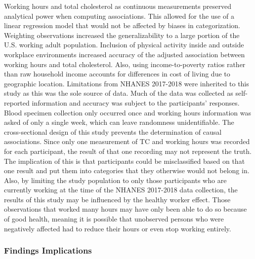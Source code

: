 \documentclass[]{elsarticle} %
\begin{document}
Working hours and total cholesterol as continuous measurements preserved
analytical power when computing associations. This allowed for the use
of a linear regression model that would not be affected by biases in
categorization. Weighting observations increased the generalizability to
a large portion of the U.S. working adult population. Inclusion of
physical activity inside and outside workplace environments increased
accuracy of the adjusted association between working hours and total
cholesterol. Also, using income-to-poverty ratios rather than raw
household income accounts for differences in cost of living due to
geographic location. Limitations from NHANES 2017-2018 were inherited to
this study as this was the sole source of data. Much of the data was
collected as self-reported information and accuracy was subject to the
participants' responses. Blood specimen collection only occurred once
and working hours information was asked of only a single week, which can
leave randomness unidentifiable. The cross-sectional design of this
study prevents the determination of causal associations. Since only one
measurement of TC and working hours was recorded for each participant,
the result of that one recording may not represent the truth. The
implication of this is that participants could be misclassified based on
that one result and put them into categories that they otherwise would
not belong in. Also, by limiting the study population to only those
participants who are currently working at the time of the NHANES
2017-2018 data collection, the results of this study may be influenced
by the healthy worker effect. Those observations that worked many hours
may have only been able to do so because of good health, meaning it is
possible that unobserved persons who were negatively affected had to
reduce their hours or even stop working entirely.

\hypertarget{findings-implications}{%
\subsubsection{Findings Implications}\label{findings-implications}}
\end{document}
